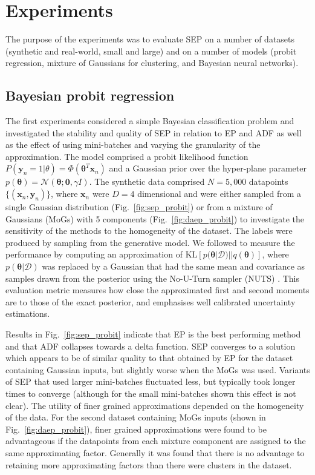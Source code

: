 \section{Experiments}

The purpose of the experiments was to evaluate SEP on a number of datasets (synthetic and real-world, small and large) and on a number of models (probit regression, mixture of Gaussians for clustering, and Bayesian neural networks).

\subsection{Bayesian probit regression}
\label{sec:chap3_exp_bayesian_probit}
%
The first experiments considered a simple Bayesian classification problem and investigated the stability and quality of SEP in relation to EP and ADF as well as the effect of using mini-batches and varying the granularity of the approximation. The model comprised a probit likelihood function $P(\bm{y}_n = 1|\theta) = \Phi(\bm{\theta}^T \bm{x}_n)$ and a Gaussian prior over the hyper-plane parameter  $p(\bm{\theta}) = \mathcal{N}(\bm{\theta}; \bm{0}, \gamma I)$.  
%
The synthetic data comprised $N=5,000$ datapoints $\{ (\bm{x}_n, \bm{y}_n) \}$, where $\bm{x}_n$ were $D=4$ dimensional and were either sampled from a single Gaussian distribution (Fig.~\ref{fig:sep_probit}) or from a mixture of Gaussians (MoGs) with 5 components (Fig.~\ref{fig:daep_probit}) to investigate the sensitivity of the methods to the homogeneity of the dataset. The labels were produced by sampling from the generative model. We followed \cite{xu:sms2014} to measure the performance by computing an approximation of $\mathrm{KL}[p(\bm{\theta}|\mathcal{D}) || q(\bm{\theta})]$, where $p(\bm{\theta}|\mathcal{D})$ was replaced by a Gaussian that had the same mean and covariance as samples drawn from the posterior using the No-U-Turn sampler (NUTS) \citep{hoffman:nuts2014}. This evaluation metric measures how close the approximated first and second moments are to those of the exact posterior, and emphasises well calibrated uncertainty estimations.

Results in Fig.~\ref{fig:sep_probit} indicate that EP is the best performing method and that ADF collapses towards a delta function. SEP converges to a solution which appears to be of similar quality to that obtained by EP for the dataset containing Gaussian inputs, but slightly worse when the MoGs was used. Variants of SEP that used larger mini-batches fluctuated less, but typically took longer times to converge (although for the small mini-batches shown this effect is not clear). The utility of finer grained approximations depended on the homogeneity of the data. For the second dataset containing MoGs inputs (shown in Fig.~\ref{fig:daep_probit}), finer grained approximations were found to be advantageous if the datapoints from each mixture component are assigned to the same approximating factor. Generally it was found that there is no advantage to retaining more approximating factors than there were clusters in the dataset.  

